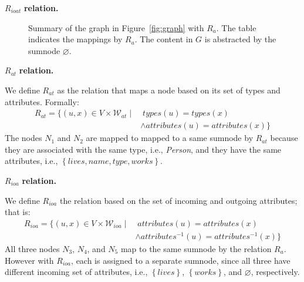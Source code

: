 \begin{labeling}{$R_{ioat}$ \textbf{relation.}}
\begin{figure}
	\centering
	\begin{minipage}{.75\textwidth}
		\resizebox{\textwidth}{!}{
			
		}
	\end{minipage}
	\quad
	\begin{minipage}[h]{.2\textwidth}
		\centering
		\caption*{$R_a\left(V, \mathcal{W}\right)$}
	\end{minipage}
	\caption{Summary of the graph in Figure~\ref{fig:graph} with $R_a$. The table indicates the mappings by $R_a$. The content in $G$ is abstracted by the sumnode $\varnothing$.}
	\label{fig:attributes-summary}
\end{figure}

\item[$R_{at}$ \textbf{relation.}]

We define $R_{at}$ as the relation that maps a node based on its set of types and attributes. Formally:
$$
\begin{aligned}
R_{at} = \{ (u, x) \in V \times \mathcal{W}_{at} \mid &\; types(u) = types(x) \\
& \wedge attributes(u) = attributes(x) \}
\end{aligned}
$$
The nodes $N_1$ and $N_2$ are mapped to mapped to a same sumnode by $R_{at}$ because they are associated with the same type, i.e., \emph{Person}, and they have the same attributes, i.e., $\left\lbrace lives, name, type, works \right\rbrace$.

\item[$R_{ioa}$ \textbf{relation.}]

We define $R_{ioa}$ the relation based on the set of incoming and outgoing attributes; that is:
$$
\begin{aligned}
R_{ioa} =
\{
(u, x) \in V \times \mathcal{W}_{ioa} \mid &\; attributes(u) = attributes(x) \\
& \wedge attributes^{-1}(u) = attributes^{-1}(x)
\}
\end{aligned}
$$
All three nodes $N_3$, $N_4$, and $N_5$ map to the same sumnode by the relation $R_a$. However with $R_{ioa}$, each is assigned to a separate sumnode, since all three have different incoming set of attributes, i.e., $\left\lbrace lives \right\rbrace$, $\left\lbrace works \right\rbrace$, and $\varnothing$, respectively.


\end{labeling}
